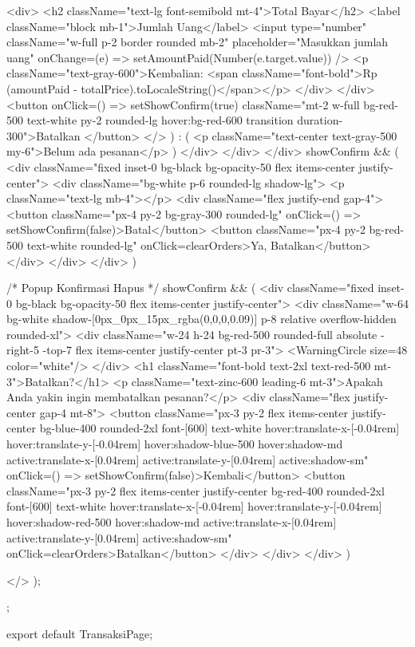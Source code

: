 {{                  <div>
                    <h2 className="text-lg font-semibold mt-4">Total Bayar</h2>
                    <label className="block mb-1">Jumlah Uang</label>
                    <input
                      type="number"
                      className="w-full p-2 border rounded mb-2"
                      placeholder="Masukkan jumlah uang"
                      onChange={(e) => setAmountPaid(Number(e.target.value))}
                    />
                    <p className="text-gray-600">Kembalian: <span className="font-bold">Rp {(amountPaid - totalPrice).toLocaleString()}</span></p>
                  </div>
                </div>
                <button onClick={() => setShowConfirm(true)} className="mt-2 w-full bg-red-500 text-white py-2 rounded-lg hover:bg-red-600 transition duration-300">Batalkan </button>
              </>
            ) : (
              <p className="text-center text-gray-500 my-6">Belum ada pesanan</p>
            )}
          </div>
        </div>
      </div>
      {showConfirm && (
        <div className="fixed inset-0 bg-black bg-opacity-50 flex items-center justify-center">
          <div className="bg-white p-6 rounded-lg shadow-lg">
            <p className="text-lg mb-4"></p>
            <div className="flex justify-end gap-4">
              <button className="px-4 py-2 bg-gray-300 rounded-lg" onClick={() => setShowConfirm(false)}>Batal</button>
              <button className="px-4 py-2 bg-red-500 text-white rounded-lg" onClick={clearOrders}>Ya, Batalkan</button>
            </div>
          </div>
        </div>
      )}

      {/* Popup Konfirmasi Hapus */}
      {showConfirm && (
        <div className="fixed inset-0 bg-black bg-opacity-50 flex items-center justify-center">
          <div className="w-64 bg-white shadow-[0px_0px_15px_rgba(0,0,0,0.09)] p-8 relative overflow-hidden rounded-xl">
            <div className="w-24 h-24 bg-red-500 rounded-full absolute -right-5 -top-7 flex items-center justify-center pt-3 pr-3">
              <WarningCircle   size={48} color="white"/>
            </div>
            <h1 className="font-bold text-2xl text-red-500 mt-3">Batalkan?</h1>
            <p className="text-zinc-600 leading-6 mt-3">Apakah Anda yakin ingin membatalkan pesanan?</p>
            <div className="flex justify-center gap-4 mt-8">
              <button className="px-3 py-2 flex items-center justify-center bg-blue-400 rounded-2xl font-[600] text-white hover:translate-x-[-0.04rem] hover:translate-y-[-0.04rem] hover:shadow-blue-500 hover:shadow-md active:translate-x-[0.04rem] active:translate-y-[0.04rem] active:shadow-sm" onClick={() => setShowConfirm(false)}>Kembali</button>
              <button className="px-3 py-2 flex items-center justify-center bg-red-400 rounded-2xl font-[600] text-white hover:translate-x-[-0.04rem] hover:translate-y-[-0.04rem] hover:shadow-red-500 hover:shadow-md active:translate-x-[0.04rem] active:translate-y-[0.04rem] active:shadow-sm" onClick={clearOrders}>Batalkan</button>
            </div>
          </div>
        </div>
      )}

    </>
  );
};

export default TransaksiPage;
